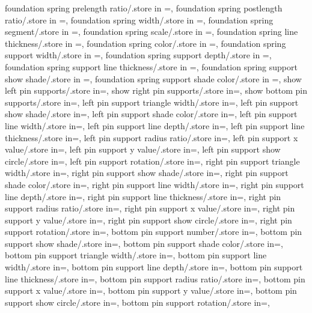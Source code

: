 {  foundation spring prelength ratio/.store in =\foundprelenratio,
  foundation spring postlength ratio/.store in =\foundpostlenratio,
  foundation spring width/.store in =\foundampl,
  foundation spring segment/.store in =\foundsegm,
  foundation spring scale/.store in =\foundspringscale,
  foundation spring line thickness/.store in =\foundspringthk,
  foundation spring color/.store in =\foundspringcolor,
  foundation spring support width/.store in =\foundsuppwidth,
  foundation spring support depth/.store in =\foundsuppdepth,
  foundation spring support line thickness/.store in =\foundsupplinethk,
  foundation spring support show shade/.store in =\foundshowsuppshade,
  foundation spring support shade color/.store in =\foundsuppshadecol,
  show left pin supports/.store in=\showleftpinsup,
  show right pin supports/.store in=\showrightpinsup,
  show bottom pin supports/.store in=\showbottompinsup,
left pin support triangle width/.store in=\lefttriw,
left pin support show shade/.store in=\showleftpinsuppshade,
left pin support shade color/.store in=\leftpinsuppshadecolor,
left pin support line width/.store in=\leftlinew,
left pin support line depth/.store in=\leftlined,
left pin support line thickness/.store in=\leftlinet,
left pin support radius ratio/.store in=\leftradratio,
left pin support x value/.store in=\leftxvalue,
left pin support y value/.store in=\leftyvalue,
left pin support show circle/.store in=\leftshowcircle,
left pin support rotation/.store in=\leftrotpin,
right pin support triangle width/.store in=\righttriw,
right pin support show shade/.store in=\showrightpinsuppshade,
right pin support shade color/.store in=\rightpinsuppshadecolor,
right pin support line width/.store in=\rightlinew,
right pin support line depth/.store in=\rightlined,
right pin support line thickness/.store in=\rightlinet,
right pin support radius ratio/.store in=\rightradratio,
right pin support x value/.store in=\rightxvalue,
right pin support y value/.store in=\rightyvalue,
right pin support show circle/.store in=\rightshowcircle,
right pin support rotation/.store in=\rightrotpin,
bottom pin support number/.store in=\nbotpin,
bottom pin support show shade/.store in=\showbottompinsuppshade,
bottom pin support shade color/.store in=\bottompinsuppshadecolor,
bottom pin support triangle width/.store in=\bottomtriw,
bottom pin support line width/.store in=\bottomlinew,
bottom pin support line depth/.store in=\bottomlined,
bottom pin support line thickness/.store in=\bottomlinet,
bottom pin support radius ratio/.store in=\bottomradratio,
bottom pin support x value/.store in=\bottomxvalue,
bottom pin support y value/.store in=\bottomyvalue,
bottom pin support show circle/.store in=\bottomshowcircle,
bottom pin support rotation/.store in=\bottomrotpin,}
